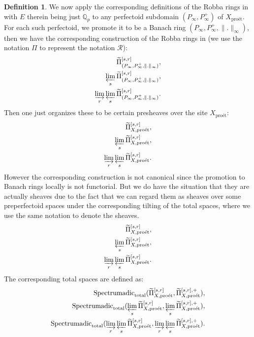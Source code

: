 \documentclass[11pt]{book}
\theoremstyle{definition}
\newtheorem{definition}[theorem]{Definition}
\numberwithin{equation}{section}
\begin{document}




\begin{definition}
We now apply the corresponding definitions of the Robba rings in \cite[Definition 4.1.1]{12KL2} with $E$ therein being just $\mathbb{Q}_p$ to any perfectoid subdomain $(P_\infty,P^+_\infty)$ of $X_\text{pro\'et}$. For each such perfectoid, we promote it to be a Banach ring $(P_\infty,P^+_\infty,\|.\|_{\infty})$, then we have the corresponding construction of the Robba rings in \cite[Definition 4.1.1]{12KL2} (we use the notation $\Pi$ to represent the notation $\mathcal{R}$):
\begin{align}
\widetilde{\Pi}^{[s,r]}_{(P_\infty,P^+_\infty,\|.\|_{\infty})},\\
\varprojlim_s \widetilde{\Pi}^{[s,r]}_{(P_\infty,P^+_\infty,\|.\|_{\infty})},\\
\varinjlim_r \varprojlim_s \widetilde{\Pi}^{[s,r]}_{(P_\infty,P^+_\infty,\|.\|_{\infty})}.	
\end{align}
Then one just organizes these to be certain presheaves over the site $X_\text{pro\'et}$:
\begin{align}
\widetilde{\Pi}^{[s,r]}_{X,\text{pro\'et}},\\
\varprojlim_s \widetilde{\Pi}^{[s,r]}_{X,\text{pro\'et}},\\
\varinjlim_r \varprojlim_s \widetilde{\Pi}^{[s,r]}_{X,\text{pro\'et}}.	
\end{align}	
However the corresponding construction is not canonical since the promotion to Banach rings locally is not functorial. But we do have the situation that they are actually sheaves due to the fact that we can regard them as sheaves over some preperfectoid spaces under the corresponding tilting of the total spaces, where we use the same notation to denote the sheaves.
\begin{align}
\widetilde{\Pi}^{[s,r]}_{X,\text{pro\'et}},\\
\varprojlim_s \widetilde{\Pi}^{[s,r]}_{X,\text{pro\'et}},\\
\varinjlim_r \varprojlim_s \widetilde{\Pi}^{[s,r]}_{X,\text{pro\'et}}.	
\end{align}	
The corresponding total spaces are defined as:
\begin{align}
\mathrm{Spectrumadic}_{\mathrm{total}}(\widetilde{\Pi}^{[s,r]}_{X,\text{pro\'et}},\widetilde{\Pi}^{[s,r],+}_{X,\text{pro\'et}}),\\
\mathrm{Spectrumadic}_{\mathrm{total}}(\varprojlim_s \widetilde{\Pi}^{[s,r]}_{X,\text{pro\'et}},\varprojlim_s \widetilde{\Pi}^{[s,r],+}_{X,\text{pro\'et}}),\\
\mathrm{Spectrumadic}_{\mathrm{total}}(\varinjlim_r \varprojlim_s \widetilde{\Pi}^{[s,r]}_{X,\text{pro\'et}},\varinjlim_r \varprojlim_s \widetilde{\Pi}^{[s,r],+}_{X,\text{pro\'et}}).	
\end{align}	
\end{definition}
\end{document}
